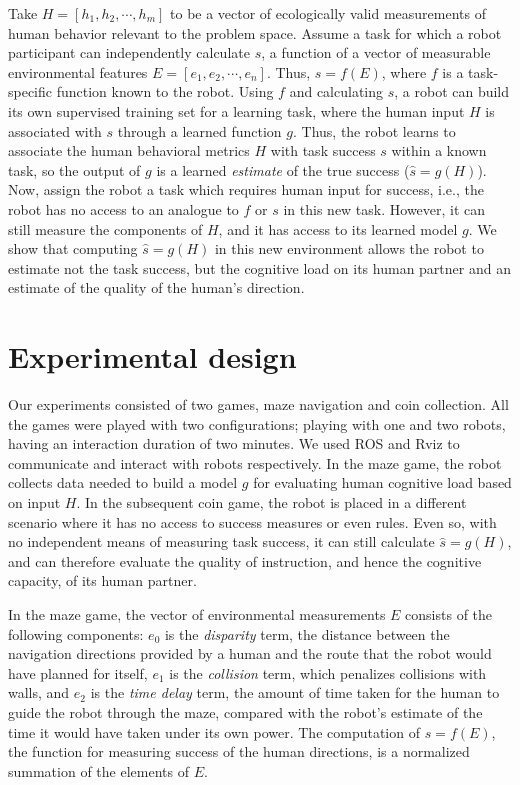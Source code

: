\documentclass{sig-alternate}
\begin{document}
Take $H=[h_1,h_2,\cdots,h_m]$ to be a vector of ecologically valid measurements of human behavior relevant to the
problem space.  Assume a task for which a robot participant can independently calculate $s$, a function of a vector of
measurable environmental features $E=[e_1,e_2,\cdots,e_n]$.  Thus, $s = f(E)$, where $f$ is a task-specific function
known to the robot.  Using $f$ and calculating $s$, a robot can build its own supervised training set for a learning
task, where the human input $H$ is associated with $s$ through a learned function $g$.  Thus, the robot learns to
associate the human behavioral metrics $H$ with task success $s$ within a known task, so the output of $g$ is a learned
\emph{estimate} of the true success ($\hat{s}=g(H)$).  Now, assign the robot a task which requires human input for
success, i.e., the robot has no access to an analogue to $f$ or $s$ in this new task.  However, it can still measure the
components of $H$, and it has access to its learned model $g$.  We show that computing $\hat{s}=g(H)$ in this new
environment allows the robot to estimate not the task success, but the cognitive load on its human partner and an
estimate of the quality of the human's direction.

\section{Experimental design} 

Our experiments consisted of two games, maze navigation \cite{crick2011human} and coin collection. All the games were
played with two configurations; playing with one and two robots, having an interaction duration of two minutes. We used
ROS and Rviz to communicate and interact with robots respectively. In the maze game, the robot collects data needed to
build a model $g$ for evaluating human cognitive load based on input $H$. In the subsequent coin game, the robot is
placed in a different scenario where it has no access to success measures or even rules.  Even so, with no independent
means of measuring task success, it can still calculate $\hat{s}=g(H)$, and can therefore evaluate the quality of
instruction, and hence the cognitive capacity, of its human partner.

In the maze game, the vector of environmental measurements $E$ consists of the following components: $e_0$ is the
\emph{disparity} term, the distance between the navigation directions provided by a human and the route that the robot
would have planned for itself, $e_1$ is the \emph{collision} term, which penalizes collisions with walls, and $e_2$ is
the \emph{time delay} term, the amount of time taken for the human to guide the robot through the maze, compared with
the robot's estimate of the time it would have taken under its own power. The computation of $s = f(E)$, the function
for measuring success of the human directions, is a normalized summation of the elements of $E$.
\end{document}
